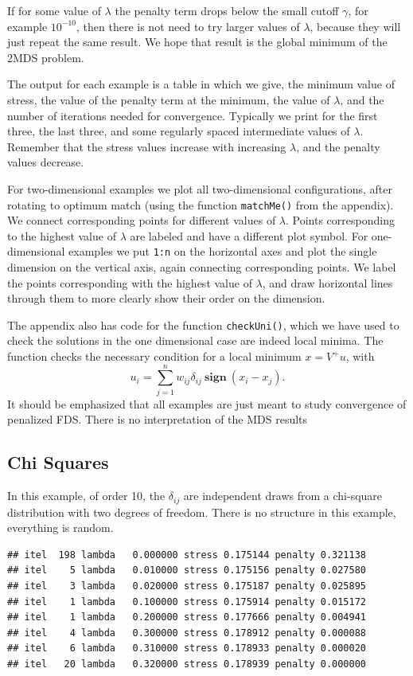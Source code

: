 \documentclass[
  12pt,
]{article}
\begin{document}
If for some value of \(\lambda\) the penalty term drops below the small
cutoff \(\gamma\), for example \ensuremath{10^{-10}}, then there is not
need to try larger values of \(\lambda\), because they will just repeat
the same result. We hope that result is the global minimum of the 2MDS
problem.

The output for each example is a table in which we give, the minimum
value of stress, the value of the penalty term at the minimum, the value
of \(\lambda\), and the number of iterations needed for convergence.
Typically we print for the first three, the last three, and some
regularly spaced intermediate values of \(\lambda\). Remember that the
stress values increase with increasing \(\lambda\), and the penalty
values decrease.

For two-dimensional examples we plot all two-dimensional configurations,
after rotating to optimum match (using the function \texttt{matchMe()}
from the appendix). We connect corresponding points for different values
of \(\lambda\). Points corresponding to the highest value of \(\lambda\)
are labeled and have a different plot symbol. For one-dimensional
examples we put \texttt{1:n} on the horizontal axes and plot the single
dimension on the vertical axis, again connecting corresponding points.
We label the points corresponding with the highest value of \(\lambda\),
and draw horizontal lines through them to more clearly show their order
on the dimension.

The appendix also has code for the function \texttt{checkUni()}, which
we have used to check the solutions in the one dimensional case are
indeed local minima. The function checks the necessary condition for a
local minimum \(x=V^+u\), with \[
u_i=\sum_{j=1}^nw_{ij}\delta_{ij}\ \mathbf{sign}\ (x_i-x_j).
\] It should be emphasized that all examples are just meant to study
convergence of penalized FDS. There is no interpretation of the MDS
results

\hypertarget{chi-squares}{%
\subsection{Chi Squares}\label{chi-squares}}

In this example, of order 10, the \(\delta_{ij}\) are independent draws
from a chi-square distribution with two degrees of freedom. There is no
structure in this example, everything is random.

\begin{verbatim}
## itel  198 lambda   0.000000 stress 0.175144 penalty 0.321138 
## itel    5 lambda   0.010000 stress 0.175156 penalty 0.027580 
## itel    3 lambda   0.020000 stress 0.175187 penalty 0.025895 
## itel    1 lambda   0.100000 stress 0.175914 penalty 0.015172 
## itel    1 lambda   0.200000 stress 0.177666 penalty 0.004941 
## itel    4 lambda   0.300000 stress 0.178912 penalty 0.000088 
## itel    6 lambda   0.310000 stress 0.178933 penalty 0.000020 
## itel   20 lambda   0.320000 stress 0.178939 penalty 0.000000
\end{verbatim}
\end{document}
